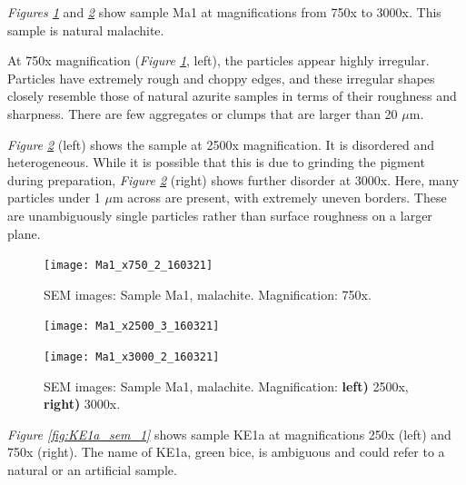 
\textit{Figures \ref{fig:Ma1_sem_1}} and \textit{\ref{fig:Ma1_sem_2}} show sample Ma1 at magnifications from 750x to 3000x. This sample is natural malachite.

At 750x magnification (\textit{Figure \ref{fig:Ma1_sem_1}}, left), the particles appear highly irregular. Particles have extremely rough and choppy edges, and these irregular shapes closely resemble those of natural azurite samples in terms of their roughness and sharpness. There are few aggregates or clumps that are larger than 20 $\mu$m.  

\textit{Figure \ref{fig:Ma1_sem_2}} (left) shows the sample at 2500x magnification. It is disordered and heterogeneous. While it is possible that this is due to grinding the pigment during preparation, \textit{Figure \ref{fig:Ma1_sem_2}} (right) shows further disorder at 3000x. Here, many particles under 1 $\mu$m across are present, with extremely uneven borders. These are unambiguously single particles rather than surface roughness on a larger plane.

\begin{figure}[H]
\centering
\texttt{[image: Ma1\_x750\_2\_160321]}
\caption[SEM images: Sample Ma1, malachite]{SEM images: Sample Ma1, malachite. Magnification: 750x.}
\label{fig:Ma1_sem_1}
\end{figure}

\begin{figure}[H]
\centering
\begin{minipage}{.45\textwidth}
  \centering
  \texttt{[image: Ma1\_x2500\_3\_160321]}
\end{minipage}
\begin{minipage}{.45\textwidth}
  \centering
  \texttt{[image: Ma1\_x3000\_2\_160321]}
\end{minipage}
\caption[SEM images: Sample Ma1, malachite]{SEM images: Sample Ma1, malachite. Magnification: \textbf{left)} 2500x, \textbf{right)} 3000x.}
\label{fig:Ma1_sem_2}
\end{figure}


\textit{Figure \ref{fig:KE1a_sem_1}} shows sample KE1a at magnifications 250x (left) and 750x (right). The name of KE1a, green bice, is ambiguous and could refer to a natural or an artificial sample.

